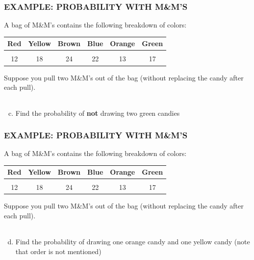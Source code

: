 \documentclass[8pt]{beamer}
\newcommand{\extitle}[1]{\frametitle{\fontfamily{fvs}\selectfont \small\color{black!70!blue!80!cyan}\uppercase{\bfseries Example: #1}}}
\def\solblank{\begin{tcolorbox}[colframe=black!50!blue!50!cyan,
colback=white,
bottomrule=0mm,
rightrule=0mm,
sharp corners=all] 
\vspace{6in}
\text{}
\end{tcolorbox}}
\begin{document}
\begin{frame}
\extitle{Probability with M\&M's}
A bag of M\&M's contains the following breakdown of colors:

\begin{center}
\begin{tabular}{c c c c c c}
\textbf{Red} & \textbf{Yellow} &  \textbf{Brown} & \textbf{Blue} & \textbf{Orange} & \textbf{Green} \\ \hline
& & & & & \\
12 & 18 & 24 &  22 &  13 & 17 \\
\end{tabular}
\end{center}
Suppose you pull two M\&M's out of the bag (without replacing the candy after each pull).\\ \text{}\\

\begin{enumerate}[(a)]
\setcounter{enumi}{2}
\item Find the probability of \textbf{not} drawing two green candies
\end{enumerate}

\solblank
\end{frame}

\begin{frame}
\extitle{Probability with M\&M's}
A bag of M\&M's contains the following breakdown of colors:

\begin{center}
\begin{tabular}{c c c c c c}
\textbf{Red} & \textbf{Yellow} &  \textbf{Brown} & \textbf{Blue} & \textbf{Orange} & \textbf{Green} \\ \hline
& & & & & \\
12 & 18 & 24 &  22 &  13 & 17 \\
\end{tabular}
\end{center}
Suppose you pull two M\&M's out of the bag (without replacing the candy after each pull).\\ \text{}\\

\begin{enumerate}[(a)]
\setcounter{enumi}{3}
\item Find the probability of drawing one orange candy and one yellow candy (note that order is not mentioned)
\end{enumerate}

\solblank
\end{frame}
\end{document}
